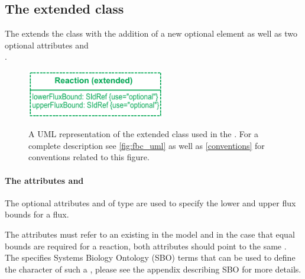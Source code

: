 

\subsection{The extended  class}
\label{reaction-class-ga}

The \FBCPackage extends the \sbmlthreecore \Reaction class with the addition of
a new optional element \GeneProductAssociation as well as two optional attributes
 and \\
.

\begin{figure}[h]
  \centering
  \includegraphics[width=6cm]{images/v2harmony_fbc_reaction.pdf}\\
  \caption{A UML representation of the extended \SBML \Reaction class used in
  the \FBCPackage. For a complete description see \ref{fig:fbc_uml} as well as \ref{conventions} for conventions related to this figure.}
  \label{fig:fbc_uml_reaction}
\end{figure}

\paragraph{The attributes  and }
The optional attributes  and  of type  are used to specify the lower and upper flux bounds for a \Reaction flux.

The attributes must refer to an existing \Parameter in the model and in the case that equal bounds are required for a reaction, both attributes should point to the same \Parameter. The \FBCPackage specifies Systems Biology Ontology (SBO) terms that can be used to define the character of such a \Parameter, please see the appendix describing SBO for more details.

